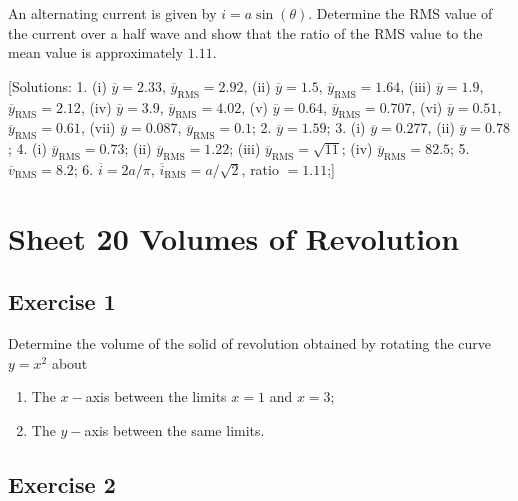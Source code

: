 \documentclass[
  english,
  11pt,
  oneside]{book}
\providecommand{\tightlist}{%
  \setlength{\itemsep}{0pt}\setlength{\parskip}{0pt}}
\newcommand{\slide}{}
\theoremstyle{definition}
\theoremstyle{definition}
\theoremstyle{definition}
\theoremstyle{definition}
\theoremstyle{remark}
\begin{document}
An alternating current is given by \(i = a\sin(\theta)\). Determine the RMS value of the current over a half wave and show that the ratio of the RMS value to the mean value is approximately \(1.11\).

{[}Solutions:
1. (i) \(\overline{y}=2.33\), \(\overline{y}_{\text{RMS}}=2.92\), (ii) \(\overline{y}=1.5\), \(\overline{y}_{\text{RMS}}=1.64\), (iii) \(\overline{y}=1.9\), \(\overline{y}_{\text{RMS}}=2.12\), (iv) \(\overline{y}=3.9\), \(\overline{y}_{\text{RMS}}=4.02\), (v) \(\overline{y}=0.64\), \(\overline{y}_{\text{RMS}}=0.707\), (vi) \(\overline{y}=0.51\), \(\overline{y}_{\text{RMS}}=0.61\), (vii) \(\overline{y}=0.087\), \(\overline{y}_{\text{RMS}}=0.1\);
2. \(\overline{y}=1.59\);
3. (i) \(\overline{y}=0.277\), (ii) \(\overline{y}=0.78\);
4. (i) \(\overline{y}_{\text{RMS}}=0.73\); (ii) \(\overline{y}_{\text{RMS}}=1.22\); (iii) \(\overline{y}_{\text{RMS}}=\sqrt{11}\); (iv) \(\overline{y}_{\text{RMS}}=82.5\);
5. \(\overline{v}_{\text{RMS}}=8.2\);
6. \(\overline{i}=2a/\pi\), \(\overline{i}_{\text{RMS}}=a/\sqrt{2}\), ratio \(=1.11\);{]}

\section{Sheet 20 Volumes of Revolution}\label{sheet-20-volumes-of-revolution}

\slide

\subsection*{Exercise 1}\label{exercise-1-10}

Determine the volume of the solid of revolution obtained by rotating the curve \(y = x^2\) about

\begin{enumerate}
\def\labelenumi{\roman{enumi}.}
\tightlist
\item
  The \(x-\)axis between the limits \(x = 1\) and \(x = 3\);
\item
  The \(y-\)axis between the same limits.
\end{enumerate}

\slide

\subsection*{Exercise 2}\label{exercise-2-10}
\end{document}

